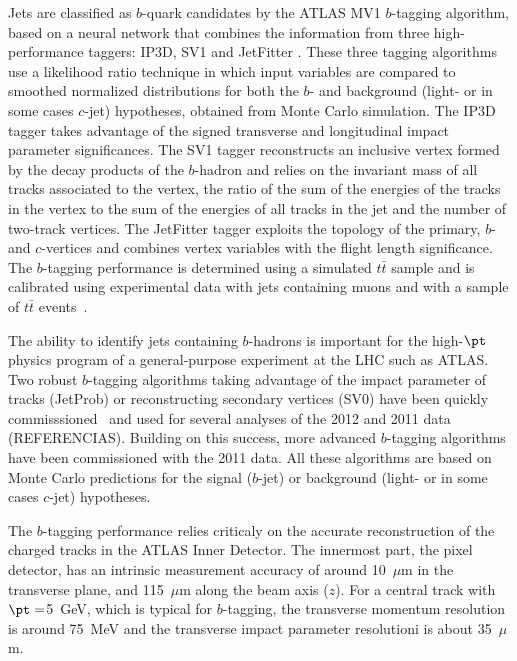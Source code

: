 Jets are classified as $b$-quark candidates by the ATLAS MV1 $b$-tagging algorithm, based on a neural network that combines the information from three high-performance taggers: IP3D, SV1 and JetFitter \cite{ATLAS-CONF-2011-102}.  These three tagging algorithms use a likelihood ratio technique in which input variables are compared to smoothed normalized distributions for both the $b$- and background (light- or in some cases $c$-jet) hypotheses, obtained from Monte Carlo simulation.  The IP3D tagger takes advantage of the signed transverse and longitudinal impact parameter significances. The SV1 tagger reconstructs an inclusive vertex formed by the decay products of the $b$-hadron and relies on the invariant mass of all tracks associated to the vertex, the ratio of the sum of the energies of the tracks in the vertex to the sum of the energies of all tracks in the jet and the number of two-track vertices. The JetFitter tagger exploits the topology of the primary, $b$- and $c$-vertices and combines vertex variables with the flight length significance.  The $b$-tagging performance is determined using a simulated $t\bar{t}$ sample and is calibrated using experimental data with jets containing muons and with a sample of $t\bar{t}$ events~\cite{ATLAS-CONF-2011-089}.




The ability to identify jets containing $b$-hadrons is important for the high-$\pt$ physics program of a general-purpose experiment at the LHC such as ATLAS. Two robust $b$-tagging algorithms taking advantage of the impact parameter of tracks (JetProb) or reconstructing secondary vertices (SV0) have been quickly commisssioned~\cite{ATLAS-CONF-2010-091}\cite{ATLAS-CONF-2010-042} and used for several analyses of the 2012 and 2011 data (REFERENCIAS).
Building on this success, more advanced $b$-tagging algorithms have been commissioned with the 2011 data. All these algorithms are based on Monte Carlo predictions for the signal ($b$-jet) or background (light- or in some cases $c$-jet) hypotheses.

The $b$-tagging performance relies criticaly on the accurate reconstruction of the charged tracks in the ATLAS Inner Detector. 
The innermost part, the pixel detector, has an intrinsic measurement accuracy of around 10~$\mu$m in the transverse plane, and 115~$\mu$m along the beam axis ($z$).  For a central track with $\pt=$5~GeV, which is typical for $b$-tagging, the transverse momentum resolution is around 75~MeV and the transverse impact parameter resolutioni is about 35~$\mu$m.

